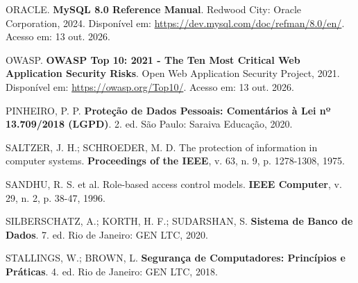 \documentclass[12pt,a4paper]{article}
\begin{document}
\vspace{0.8em}
\noindent ORACLE. \textbf{MySQL 8.0 Reference Manual}. Redwood City: Oracle Corporation, 2024. Disponível em: \url{https://dev.mysql.com/doc/refman/8.0/en/}. Acesso em: 13 out. 2026.

\vspace{0.8em}
\noindent OWASP. \textbf{OWASP Top 10: 2021 - The Ten Most Critical Web Application Security Risks}. Open Web Application Security Project, 2021. Disponível em: \url{https://owasp.org/Top10/}. Acesso em: 13 out. 2026.

\vspace{0.8em}
\noindent PINHEIRO, P. P. \textbf{Proteção de Dados Pessoais: Comentários à Lei nº 13.709/2018 (LGPD)}. 2. ed. São Paulo: Saraiva Educação, 2020.

\vspace{0.8em}
\noindent SALTZER, J. H.; SCHROEDER, M. D. The protection of information in computer systems. \textbf{Proceedings of the IEEE}, v. 63, n. 9, p. 1278-1308, 1975.

\vspace{0.8em}
\noindent SANDHU, R. S. et al. Role-based access control models. \textbf{IEEE Computer}, v. 29, n. 2, p. 38-47, 1996.

\vspace{0.8em}
\noindent SILBERSCHATZ, A.; KORTH, H. F.; SUDARSHAN, S. \textbf{Sistema de Banco de Dados}. 7. ed. Rio de Janeiro: GEN LTC, 2020.

\vspace{0.8em}
\noindent STALLINGS, W.; BROWN, L. \textbf{Segurança de Computadores: Princípios e Práticas}. 4. ed. Rio de Janeiro: GEN LTC, 2018.
\end{document}
